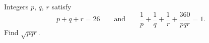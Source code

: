 Integers $p$, $q$, $r$ satisfy
\[
p+q+r=26\qquad\text{and}\qquad\dfrac{1}{p}+\dfrac{1}{q}+\dfrac{1}{r}+\dfrac{360}{pqr}=1 .
\]
Find $\sqrt{pqr}$.
